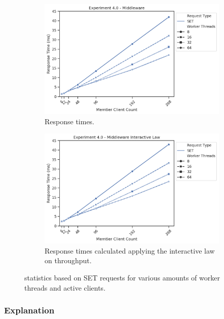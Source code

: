 \begin{figure}
{\begin{subfigure}[t!]{0.55\textwidth}
                    \includegraphics[width=1\textwidth]{../data_analysis/figures/4-0_mw_response_time.png}
                    \caption{Response times.\label{fig:sets_mw_rt}}
                \end{subfigure}
                \begin{subfigure}[t!]{0.55\textwidth}
                    \centering
                    \includegraphics[width=1\textwidth]{../data_analysis/figures/4-0_mw_response-time-il.png}
                    \caption{Response times calculated applying the interactive law on throughput.
                             \label{fig:sets_mw_tp-il}}
                \end{subfigure}
            \caption{\mw{} statistics based on SET requests for various amounts of worker threads and active
                     clients.\label{fig:mw_sets_sll}}
            }
        \end{figure}

        \subsubsection{Explanation\label{subsubsec:4_full-system_explanation}}

